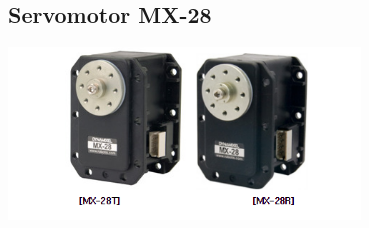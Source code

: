\documentclass[a4paper]{book}
\begin{document}
\subsection{Servomotor MX-28}

\begin{center}
\includegraphics[width=0.7\textwidth]{Figures/Hardware/Partes/MX-28.png}
\label{fig:Hardware:Partes:MX-28}
\end{center}
\end{document}
